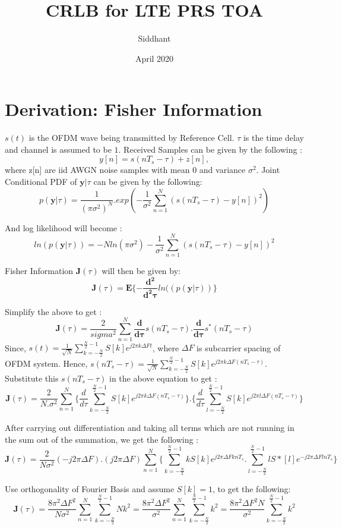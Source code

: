 \documentclass{article}
\title{CRLB for LTE PRS TOA}
\author{Siddhant }
\date{April 2020}
\begin{document}
\maketitle

\section{Derivation: Fisher Information}
$s(t)$ is the OFDM wave being transmitted by Reference Cell. $\tau$ is the time delay and channel is assumed to be $1$. Received Samples can be given by the following :$$y[n] = s(nT_s - \tau) + z[n],$$where z[n] are iid AWGN noise samples with mean $0$ and variance $\sigma^2$.  
Joint Conditional PDF of $\mathbf y|\tau$ can be given by the following:
$$p(\mathbf y|\tau) = \frac{1}{(\pi \sigma^2)^N} .exp(-\frac{1}{\sigma^2}\sum^{N}_{n=1}(s(n T_s - \tau) - y[n])^2)$$

And log likelihood will become :
$$ln(p(\mathbf y|\tau)) = -N ln(\pi \sigma^2) -\frac{1}{\sigma^2}\sum^{N}_{n=1}(s(nT_s - \tau) - y[n])^2$$

Fisher Information $\mathbf J(\tau)$ will then be given by:
$$\mathbf{J}(\tau) = \mathbf E\{ - \mathbf{\frac{d^2}{d^2\tau}}ln((p(\mathbf y|\tau)) \}$$

Simplify the above to get :
$$\mathbf{J}(\tau) = \frac{2}{sigma^2}\sum^{N}_{n=1}\mathbf{\frac{d}{d\tau}}s(n T_s - \tau).\mathbf{\frac{d}{d\tau}}s^*(n T_s - \tau)$$
Since, $s(t) = \frac{1}{\sqrt{N}}\sum^{\frac{N}{2} - 1}_{k=-\frac{N}{2}}S[k]e^{j2\pi k\Delta F t}$, where $\Delta F$ is subcarrier spacing of OFDM system. Hence, $s(n T_s - \tau) = \frac{1}{\sqrt{N}}\sum^{\frac{N}{2} - 1}_{k=-\frac{N}{2}}S[k]e^{j2\pi k\Delta F (n T_s - \tau)}$. Substitute this $s(n T_s - \tau)$ in the above equation to get : 
$$\mathbf{J}(\tau) = \frac{2}{N.\sigma^2} \sum^{N}_{n=1}\{\frac{d}{d\tau}\sum^{\frac{N}{2} - 1}_{k=-\frac{N}{2}}S[k]e^{j2\pi k\Delta F (n T_s - \tau)}\}.\{\frac{d}{d\tau}\sum^{\frac{N}{2} - 1}_{l=-\frac{N}{2}}S[k]e^{j2\pi l\Delta F (n T_s - \tau)}\}$$

After carrying out differentiation and taking all terms which are not running in the sum out of the summation, we get the following :
$$\mathbf{J}(\tau) = \frac{2}{N\sigma^2}(-j2\pi \Delta F).(j2\pi \Delta F)\sum^{N}_{n=1} \{\sum^{\frac{N}{2} - 1}_{k=-\frac{N}{2}}k S[k]e^{j2\pi \Delta F k n T_s}.\sum^{\frac{N}{2} - 1}_{l=-\frac{N}{2}}l S*[l]e^{-j2\pi \Delta F l n T_s}\}$$

Use orthogonality of Fourier Basis and assume $S[k] = 1$, to get the following:
$$\mathbf{J}(\tau) = \frac{8\pi^2 \Delta F^2}{N\sigma^2} \sum^{N}_{n=1} \sum^{\frac{N}{2} - 1}_{k=-\frac{N}{2}}N k^2 = \frac{8\pi^2 \Delta F^2}{\sigma^2} \sum^{N}_{n=1} \sum^{\frac{N}{2} - 1}_{k=-\frac{N}{2}}k^2 = \frac{8\pi^2 \Delta F^2 N}{\sigma^2}\sum^{\frac{N}{2} - 1}_{k=-\frac{N}{2}}k^2$$
\end{document}
